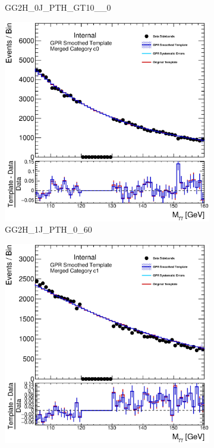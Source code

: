 \begin{figure}
\begin{center}
\begin{subfigure}[T]{0.49\linewidth}
	\caption{GG2H\_0J\_PTH\_GT10\_\_0}
\end{subfigure}
\begin{subfigure}[T]{0.49\linewidth}
	\centering
	\includegraphics[width=\linewidth]{figures/background/gpr/coupCatTemplates/GPR_Smoothed_Plot_hmgg_2Merge4_c0.eps}
	\caption{GG2H\_1J\_PTH\_0\_60}
\end{subfigure}
\begin{subfigure}[T]{0.49\linewidth}
	\centering
	\includegraphics[width=\linewidth]{figures/background/gpr/coupCatTemplates/GPR_Smoothed_Plot_hmgg_2Merge4_c1.eps}

\end{subfigure}
\end{center}
\end{figure}
